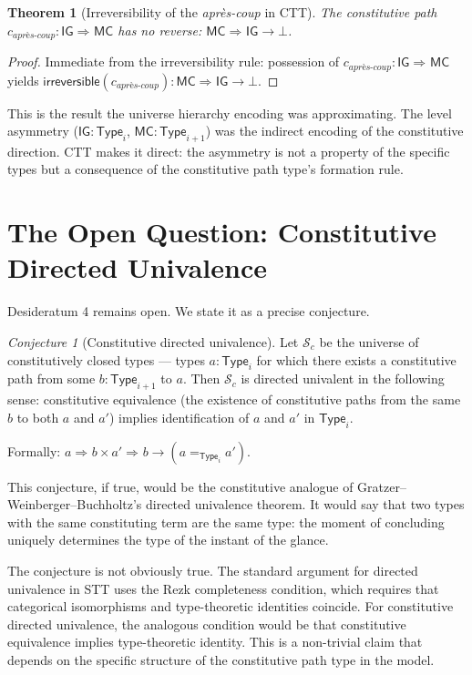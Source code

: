 \documentclass[12pt]{article}
\newtheorem{theorem}{Theorem}
\theoremstyle{definition}
\theoremstyle{remark}
\newtheorem{conjecture}{Conjecture}
\newcommand{\Type}[1]{\mathsf{Type}_{#1}}
\newcommand{\aprescoup}{\textit{apr\`{e}s-coup}}
\newcommand{\consthom}[3]{#2 \Rightarrow_{#1} #3}
\newcommand{\MC}{\mathsf{MC}}
\newcommand{\IG}{\mathsf{IG}}
\begin{document}
\begin{theorem}[Irreversibility of the \aprescoup{} in CTT]
The constitutive path $c_{\aprescoup} : \consthom{}{\IG}{\MC}$ has no reverse: $\consthom{}{\MC}{\IG} \to \bot$.
\end{theorem}

\begin{proof}
Immediate from the irreversibility rule: possession of $c_{\aprescoup} : \consthom{}{\IG}{\MC}$ yields $\mathsf{irreversible}(c_{\aprescoup}) : \consthom{}{\MC}{\IG} \to \bot$.
\end{proof}

This is the result the universe hierarchy encoding was approximating. The level asymmetry ($\IG : \Type{i}$, $\MC : \Type{i+1}$) was the indirect encoding of the constitutive direction. CTT makes it direct: the asymmetry is not a property of the specific types but a consequence of the constitutive path type's formation rule.

\section{The Open Question: Constitutive Directed Univalence}

Desideratum 4 remains open. We state it as a precise conjecture.

\begin{conjecture}[Constitutive directed univalence]
Let $\mathcal{S}_c$ be the universe of constitutively closed types --- types $a : \Type{i}$ for which there exists a constitutive path from some $b : \Type{i+1}$ to $a$. Then $\mathcal{S}_c$ is directed univalent in the following sense: constitutive equivalence (the existence of constitutive paths from the same $b$ to both $a$ and $a'$) implies identification of $a$ and $a'$ in $\Type{i}$.

Formally: $\consthom{}{a}{b} \times \consthom{}{a'}{b} \to (a =_{\Type{i}} a')$.
\end{conjecture}

This conjecture, if true, would be the constitutive analogue of Gratzer--Weinberger--Buchholtz's directed univalence theorem. It would say that two types with the same constituting term are the same type: the moment of concluding uniquely determines the type of the instant of the glance.

The conjecture is not obviously true. The standard argument for directed univalence in STT uses the Rezk completeness condition, which requires that categorical isomorphisms and type-theoretic identities coincide. For constitutive directed univalence, the analogous condition would be that constitutive equivalence implies type-theoretic identity. This is a non-trivial claim that depends on the specific structure of the constitutive path type in the model.
\end{document}
